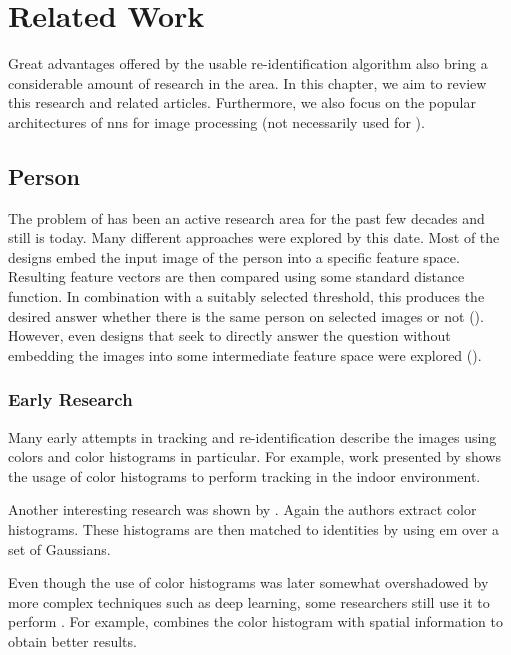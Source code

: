\chapter{Related Work}

\label{ch:related_work}


Great advantages offered by the usable re-identification algorithm also bring a considerable amount of research in the area. In this chapter, we aim to review this research and related articles. Furthermore, we also focus on the popular architectures of \glspl{nn} for image processing (not necessarily used for \reid{}).


\section{Person \Reid{}}

\label{sec:person_reid}

The problem of \reid{} has been an active research area for the past few decades and still is today. Many different approaches were explored by this date. Most of the designs embed the input image of the person into a specific feature space. Resulting feature vectors are then compared using some standard distance function. In combination with a suitably selected threshold, this produces the desired answer whether there is the same person on selected images or not (\cite{cheng2016person}). However, even designs that seek to directly answer the question without embedding the images into some intermediate feature space were explored (\cite{li2014deepreid}).

\subsection{Early Research}
\label{sec:early_research}

Many early attempts in tracking and re-identification describe the images using colors and color histograms in particular. For example, work presented by \cite{krumm2000multi} shows the usage of color histograms to perform tracking in the indoor environment.

Another interesting research was shown by \cite{orwell1999multi}. Again the authors extract color histograms. These histograms are then matched to identities by using \gls{em} over a set of Gaussians.

Even though the use of color histograms was later somewhat overshadowed by more complex techniques such as deep learning, some researchers still use it to perform \reid{}. For example, \cite{zeng2014person} combines the color histogram with spatial information to obtain better results.


